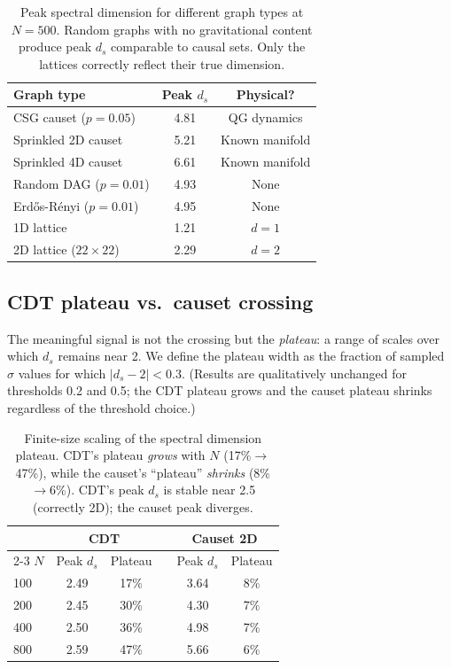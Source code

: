 \documentclass[aps,prd,twocolumn,superscriptaddress,nofootinbib]{revtex4-2}
\begin{document}
\begin{table}[h]
\centering
\begin{tabular}{lcc}
\toprule
Graph type & Peak $d_s$ & Physical? \\
\midrule
CSG causet ($p = 0.05$) & 4.81 & QG dynamics \\
Sprinkled 2D causet & 5.21 & Known manifold \\
Sprinkled 4D causet & 6.61 & Known manifold \\
Random DAG ($p = 0.01$) & 4.93 & None \\
Erd\H{o}s-R\'enyi ($p = 0.01$) & 4.95 & None \\
1D lattice & 1.21 & $d = 1$ \\
2D lattice ($22 \times 22$) & 2.29 & $d = 2$ \\
\bottomrule
\end{tabular}
\caption{Peak spectral dimension for different graph types at $N = 500$. Random graphs with no gravitational content produce peak $d_s$ comparable to causal sets. Only the lattices correctly reflect their true dimension.}
\label{tab:crossing}
\end{table}

\subsection{CDT plateau vs.\ causet crossing}

The meaningful signal is not the crossing but the \emph{plateau}: a range of scales over which $d_s$ remains near 2. We define the plateau width as the fraction of sampled $\sigma$ values for which $|d_s - 2| < 0.3$. (Results are qualitatively unchanged for thresholds 0.2 and 0.5; the CDT plateau grows and the causet plateau shrinks regardless of the threshold choice.)

\begin{table}[h]
\centering
\begin{tabular}{lccccc}
\toprule
& \multicolumn{2}{c}{CDT} & & \multicolumn{2}{c}{Causet 2D} \\
\cmidrule{2-3} \cmidrule{5-6}
$N$ & Peak $d_s$ & Plateau & & Peak $d_s$ & Plateau \\
\midrule
100 & 2.49 & 17\% & & 3.64 & 8\% \\
200 & 2.45 & 30\% & & 4.30 & 7\% \\
400 & 2.50 & 36\% & & 4.98 & 7\% \\
800 & 2.59 & 47\% & & 5.66 & 6\% \\
\bottomrule
\end{tabular}
\caption{Finite-size scaling of the spectral dimension plateau. CDT's plateau \emph{grows} with $N$ (17\%$\to$47\%), while the causet's ``plateau'' \emph{shrinks} (8\%$\to$6\%). CDT's peak $d_s$ is stable near 2.5 (correctly 2D); the causet peak diverges.}
\label{tab:plateau}
\end{table}
\end{document}
